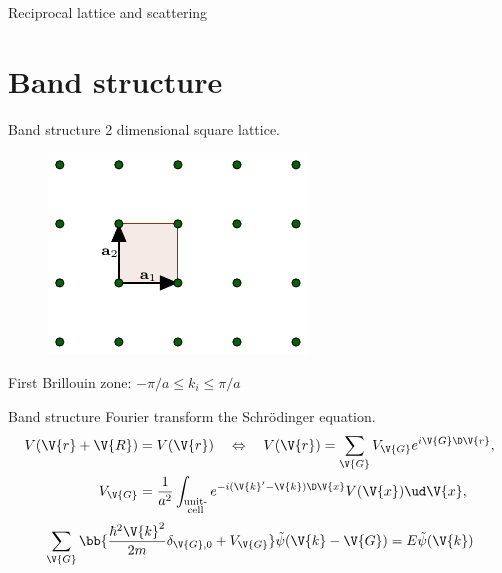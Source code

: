 \documentclass{beamer}
\begin{document}
\begin{frame}{Reciprocal lattice and scattering}
\end{frame}


\section{Band structure}
\begin{frame}{Band structure}
	2 dimensional square lattice.
	\begin{figure}[H]
		\centering
		\includegraphics[width=0.5\linewidth]{figures/squareUnit.pdf}
		\label{fig:band_structure_lattice}
	\end{figure}
	First Brillouin zone: $ -\pi/a \leq k_i \leq \pi/a $
\end{frame}

\begin{frame}{Band structure}
Fourier transform the Schrödinger equation.
\begin{align*}\label{key}
	V(\V{r}+\V{R}) &= V(\V{r}) \quad \Leftrightarrow \quad V(\V{r}) = \sum_{\V{G}} V_{\V{G}} e^{i\V{G} \D \V{r}},\\
	V_{\V{G}} &= \frac{1}{a^2}\int_{\substack{\text{unit-} \\\text{cell}}} e^{-i (\V{k}'-\V{k}) \D \V{x}} V(\V{x}) \ud \V{x},
\end{align*}
\begin{equation*}\label{key}
	\sum_{\V{G}} \bb{\frac{\hbar^2 \V{k}^2}{2m} \delta_{\V{G},0} + V_{\V{G}} } \tilde{\psi}(\V{k}-\V{G}) = E \tilde{\psi} (\V{k})
\end{equation*}
\end{frame}
\end{document}
